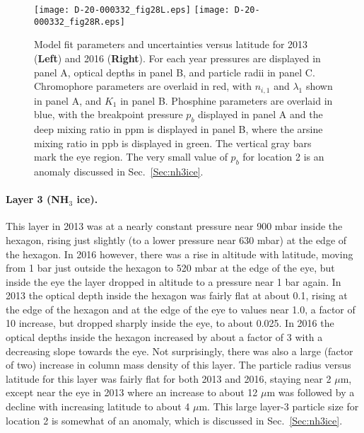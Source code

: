 \documentclass[article,11pt]{emulateapj}
\def\mum{$\mu$m }
\def\mumx{$\mu$m}
\def\nht{NH$_3$ }
\begin{document}
\begin{figure*}[!ht]\centering
\texttt{[image: D-20-000332\_fig28L.eps]}
\texttt{[image: D-20-000332\_fig28R.eps]}
\caption{Model fit parameters and uncertainties versus latitude for 2013 ({\bf Left}) and
2016 ({\bf Right}). For each year pressures are displayed in panel A, optical depths in panel B, and
particle radii in panel C. Chromophore parameters are overlaid in red, with $n_{i,1}$ and
$\lambda_1$ shown in panel A, and $K_1$ in panel B. Phosphine parameters are overlaid in blue,
with the breakpoint pressure $p_b$ displayed in panel A and the deep mixing ratio in ppm is
displayed in panel B, where the arsine mixing ratio in ppb is displayed in green. The vertical
gray bars mark the eye region. The very small value of $p_b$ for location 2 is
an anomaly discussed in Sec.\ \ref{Sec:nh3ice}.}
\label{Fig:2013+2016}
\end{figure*}


\paragraph{Layer 3 (\nht ice).}  This layer in 2013 was at a nearly constant
pressure near 900 mbar inside the hexagon, rising just slightly (to a lower
pressure near 630 mbar) at the edge of the hexagon.  In 2016 however, there
was a rise in altitude with latitude, moving from 1 bar just outside
the hexagon to 520 mbar at the edge of the eye, but inside the eye
the layer dropped in altitude to a pressure near 1 bar again.
In 2013 the optical depth inside the hexagon was fairly flat at about 0.1,
rising at the edge of the hexagon and at the edge of the eye to values
near 1.0, a factor of 10 increase, but dropped sharply inside the eye,
to about 0.025.  In 2016 the optical depths inside the hexagon increased
by about a factor of 3 with a decreasing slope towards the eye.  Not 
surprisingly, there was also a large (factor of two) increase in
column mass density of this layer.
The particle radius versus latitude for this layer was fairly flat for both 2013 and 2016,
staying near 2 \mumx, except near the eye in 2013 where an increase to
about 12 \mum was followed by a decline with increasing latitude to about 4 \mumx.
This large layer-3 particle size for location 2 is somewhat of an anomaly,
which is discussed in Sec.\ \ref{Sec:nh3ice}.
\end{document}
